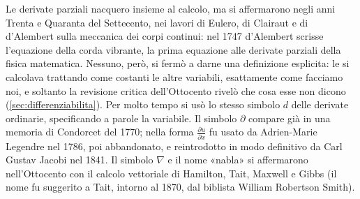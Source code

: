 \begin{notastorica}
Le derivate parziali nacquero insieme al calcolo, ma si affermarono negli anni Trenta e
Quaranta del Settecento, nei lavori di Eulero, di Clairaut e di d'Alembert sulla
meccanica dei corpi continui: nel 1747 d'Alembert scrisse l'equazione della corda
vibrante, la prima equazione alle derivate parziali della fisica matematica. Nessuno,
però, si fermò a darne una definizione esplicita: le si calcolava trattando come
costanti le altre variabili, esattamente come facciamo noi, e soltanto la revisione
critica dell'Ottocento rivelò che cosa esse non dicono
(\cref{sec:differenziabilita}). Per molto tempo si usò lo stesso simbolo $d$ delle
derivate ordinarie, specificando a parole la variabile. Il simbolo $\partial$ compare
già in una memoria di Condorcet del 1770; nella forma $\frac{\partial u}{\partial x}$ fu
usato da Adrien-Marie Legendre nel 1786, poi abbandonato, e reintrodotto in modo
definitivo da Carl Gustav Jacobi nel 1841. Il simbolo $\nabla$ e il nome «nabla» si
affermarono nell'Ottocento con il calcolo vettoriale di Hamilton, Tait, Maxwell e
Gibbs (il nome fu suggerito a Tait, intorno al 1870, dal biblista William Robertson
Smith).
\end{notastorica}
